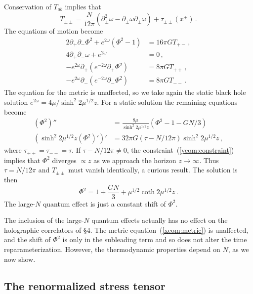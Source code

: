 \documentclass[12pt]{article}
\newcommand{\JP}[1]{{\emph{\textcolor{red}{#1}}}}
\newcommand{\be}{\begin{equation}}
\newcommand{\ee}{\end{equation}}
\begin{document}
{Conservation of $T_{ab}$ implies that
\be
T_{\pm\pm} = \frac{N}{12\pi} (\partial_\pm^2  \omega - \partial_\pm \omega\partial_\pm \omega) + \tau_{\pm\pm}(x^\pm) \,.
\ee
The equations of motion become
\begin{align}
2 \partial_+ \partial_- \Phi^2+ e^{2 \omega}  \left( \Phi^2 - 1\right) &= 16\pi G T_{+-} \,,\label{xeom:dilaton}\\
4 \partial_+ \partial_- \omega +  {e^{2 \omega} } &= 0 \,,\label{xeom:metric}\\
-e^{2 \omega} \partial_+ \left( e^{-2 \omega} \partial_+ \Phi^2 \right) &=  8\pi G T_{++} \,,\label{xeom:constraint+}\\
-e^{2 \omega} \partial_- \left( e^{-2 \omega} \partial_- \Phi^2 \right)& = 8\pi G T_{--}  \,.\label{xeom:constraint-}
\end{align}
The equation for the metric is unaffected, so we take again the static black hole solution $e^{2\omega} = {4\mu}/{\sinh^2 2\mu^{1/2}z}$.
For a static solution the remaining equations become
\begin{align}
(\Phi^2)'' &= \frac{8 \mu}{\sinh^2 2\mu^{1/2}z} (\Phi^2 - 1 - GN/3) \\
(\sinh^2 2\mu^{1/2}z (\Phi^2)')' &= 32\pi G (\tau - N/12\pi) \sinh^2 2\mu^{1/2}z  \label{yeom:constraint}\,,
\end{align}
where $\tau_{++} = \tau_{--} = \tau$.  If $\tau - N/12\pi \neq 0$, the constraint~(\ref{yeom:constraint}) implies that $\Phi^2$ diverges $\propto z$ as we approach the horizon $z \to \infty$.  Thus $\tau = N/12\pi$ and $T_{\pm\pm}$ must vanish identically, a curious result.  The solution is then
\be
\Phi^2 = 1 + \frac{GN}{3} + \mu^{1/2}  \coth 2\mu^{1/2}z \,.
\ee
The large-$N$ quantum effect is just a constant shift of $\Phi^2$.

The inclusion of the large-$N$ quantum effects actually has no effect on the holographic correlators of \S4.  The metric equation~(\ref{xeom:metric}) is unaffected, and the shift of $\Phi^2$ is only in the subleading term and so does not alter the time reparameterization.  However, the thermodynamic properties depend on $N$, as we now show.


\subsection{The renormalized stress tensor}

}
\end{document}
